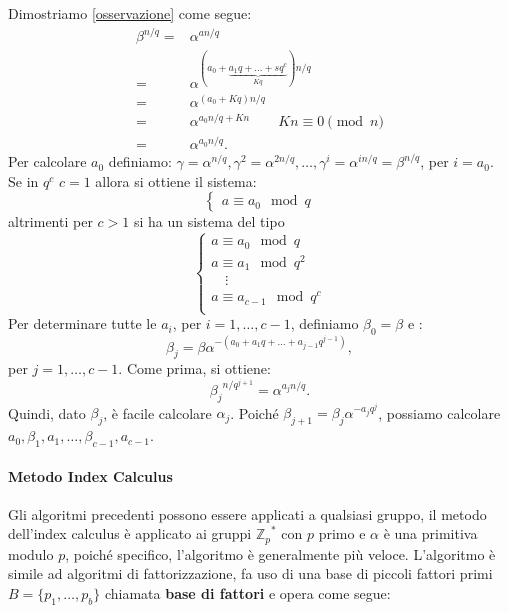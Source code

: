 \noindent Dimostriamo \ref{osservazione} come segue:
\begin{align*}
    \beta^{n/q}=& \alpha^{an/q} \\
    =& \alpha^{(a_0+\underbrace{a_1q+\dots+sq^c}_{Kq})n/q}\\
    =& \alpha^{(a_0+Kq)n/q} \\
    =& \alpha^{a_0n/q+Kn} \qquad Kn \equiv 0 \pmod n\\
    =& \alpha^{a_0n/q}.
\end{align*}
Per calcolare $a_0$ definiamo: $\gamma=\alpha^{n/q}, \gamma^2=\alpha^{2n/q}, \dots, \gamma^i=\alpha^{in/q}=\beta^{n/q}$, per $i=a_0$. \\ Se in $q^c$ $c=1$ allora si ottiene il sistema:
\[
\begin{cases}
    a \equiv a_0 \mod q    
\end{cases}
\]
altrimenti per $c > 1$ si ha un sistema del tipo
\[
\begin{cases}
    a \equiv a_0 \mod q   \\  
    a \equiv a_1 \mod q^2 \\  
    \quad \vdots\\
    a \equiv a_{c-1} \mod q^{c}\\
\end{cases}
\]
Per determinare tutte le $a_i$, per $i=1,\dots,c-1$, definiamo $\beta_0=\beta$ e : 
\[
\beta_j=\beta\alpha^{-\left(a_0+a_1q+ \dots + a_{j-1}{q^{j-1}}\right)},
\]per $j=1,\dots,c-1$. Come prima, si ottiene: 
\[  {\beta_j}^{n/q^{j+1}} = \alpha ^{a_j n/q}.
\]
Quindi, dato $\beta_j$, è facile calcolare $\alpha_j$. Poiché $\beta_{j+1}=\beta_j \alpha^{-a_jq^j}$, possiamo calcolare $a_0,\beta_1,a_1, \dots, \beta_{c-1}, a_{c-1}$.

 

\paragraph{Metodo Index Calculus}
Gli algoritmi precedenti possono essere applicati a qualsiasi gruppo, il metodo dell'index calculus è applicato ai gruppi ${\mathbb{Z}_p}^*$ con $p$ primo e $\alpha$ è una primitiva modulo $p$, poiché specifico, l'algoritmo è generalmente più veloce. L'algoritmo è simile ad algoritmi di fattorizzazione, fa uso di una base di piccoli fattori primi $B = \{p_1,\dots,p_b\}$ chiamata \textbf{base di fattori} e opera come segue:

